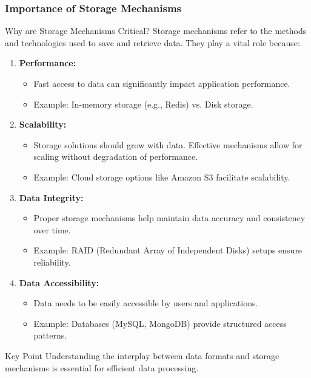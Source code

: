 \documentclass[aspectratio=169]{beamer}
\begin{document}
\begin{frame}[fragile]
    \frametitle{Importance of Storage Mechanisms}
    \begin{block}{Why are Storage Mechanisms Critical?}
        Storage mechanisms refer to the methods and technologies used to save and retrieve data. They play a vital role because:
    \end{block}
    \begin{enumerate}
        \item \textbf{Performance:}
        \begin{itemize}
            \item Fast access to data can significantly impact application performance.
            \item Example: In-memory storage (e.g., Redis) vs. Disk storage.
        \end{itemize}
        
        \item \textbf{Scalability:}
        \begin{itemize}
            \item Storage solutions should grow with data. Effective mechanisms allow for scaling without degradation of performance.
            \item Example: Cloud storage options like Amazon S3 facilitate scalability.
        \end{itemize}

        \item \textbf{Data Integrity:}
        \begin{itemize}
            \item Proper storage mechanisms help maintain data accuracy and consistency over time.
            \item Example: RAID (Redundant Array of Independent Disks) setups ensure reliability.
        \end{itemize}

        \item \textbf{Data Accessibility:}
        \begin{itemize}
            \item Data needs to be easily accessible by users and applications.
            \item Example: Databases (MySQL, MongoDB) provide structured access patterns.
        \end{itemize}
    \end{enumerate}
    \begin{block}{Key Point}
        Understanding the interplay between data formats and storage mechanisms is essential for efficient data processing.
    \end{block}
\end{frame}
\end{document}
